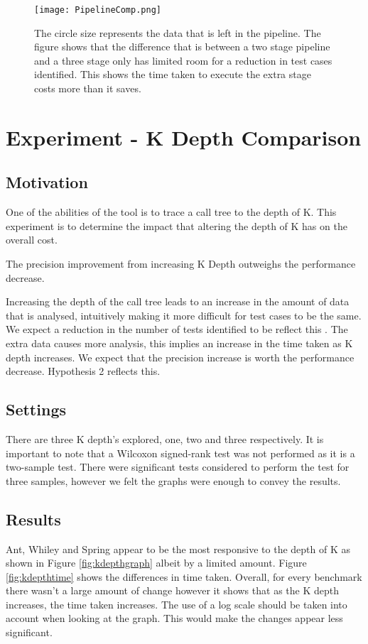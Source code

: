 \begin{figure}[h]
\centering
\texttt{[image: PipelineComp.png]}
\caption{The circle size represents the data that is left in the pipeline. The figure shows that the difference that is between a two stage pipeline and a three stage only has limited room for a reduction in test cases identified. This shows the time taken to execute the extra stage costs more than it saves.}
\label{fig:pipelinecomp}
\end{figure}

\section{Experiment  - K Depth Comparison}
\label{kdepthcomp}
\subsection{Motivation}
One of the abilities of the tool is to trace a call tree to the depth of K. This experiment is to determine the impact that altering the depth of K has on the overall cost. 

\begin{hyp}
The precision improvement from increasing K Depth outweighs the performance decrease.
\end{hyp}

Increasing the depth of the call tree leads to an increase in the amount of data that is analysed, intuitively making it more difficult for test cases to be the same. We expect a reduction in the number of tests identified to be reflect this . The extra data causes more analysis, this implies an increase in the time taken as K depth increases. We expect that the precision increase is worth the performance decrease. Hypothesis 2 reflects this.

\subsection{Settings}
There are three K depth's explored, one, two and three respectively. It is important to note that a Wilcoxon signed-rank test was not performed as it is a two-sample test. There were significant tests considered to perform the test for three samples, however we felt the graphs were enough to convey the results.


\subsection{Results}
Ant, Whiley and Spring appear to be the most responsive to the depth of K as shown in Figure \ref{fig:kdepthgraph} albeit by a limited amount. Figure \ref{fig:kdepthtime} shows the differences in time taken. Overall, for every benchmark there wasn't a large amount of change however it shows that as the K depth increases, the time taken increases. The use of a log scale should be taken into account when looking at the graph. This would make the changes appear less significant. 

